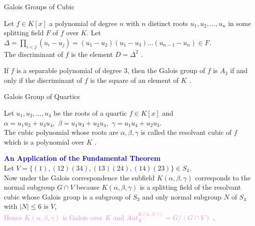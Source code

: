 \begin{frame}{Galois Groups of Cubic}
\begin{definition}
  Let \(f \in K[x]\) a polynomial of degree \(n\) with \(n\) distinct roots \(u_1,u_2,...,u_n\) in some splitting field \(F\) of \(f\) over \(K\). Let \\
  \(\Delta = \prod\limits_{i<j}(u_i-u_j) = (u_1-u_2)(u_1-u_3)...(u_{n-1}-u_n) \in F\).\\
  The discriminant of \(f\) is the element \(D= {\Delta}^2\) \cite{hunger}.
\end{definition}
\vspace{5mm}

\begin{theorem}[Theorem]
  If \(f\) is a separable polynomial of degree \(3\), then the Galois group of \(f\) is \(A_3\) if and only if the discriminant of \(f\) is the square of an element of \(K\) \cite{hunger}.
\end{theorem}
\end{frame}

\begin{frame}{Galois Group of Quartics}
  \begin{definition}
Let \(u_1,u_2,...,u_4\) be the roots of a quartic \(f \in K[x]\) and\\ \(\alpha=u_1u_2+u_3u_4,\) \(\beta=u_1u_3+u_2u_4,\) \(\gamma=u_1u_4+u_2u_3\). \\[3mm]
\textcolor{green!50!black}{The cubic polynomial whose roots are \(\alpha,\beta,\gamma \)} is called the resolvant cubic of \(f\) which is a polynomial over \(K\) \cite{hunger}.
\end{definition}
\vspace{2mm}
\textbf{\textcolor{blue}{An Application of the Fundamental Theorem}} \\[3mm]
Let \(V=\{(1),(12)(34),(13)(24),(14)(23)\} \in S_4\).\\[2mm]
Now under \textcolor{green!50!black}{the Galois correspondence the subfield \(K(\alpha, \beta, \gamma)\) corresponds to the normal subgroup \(G \cap V\)} \cite{hunger} because \(K(\alpha,\beta,\gamma)\) is a splitting field of the resolvant cubic
whose Galois group is a subgroup of \(S_3\) and only normal subgroup \(N\) of \(S_4\) with \(|N| \leq 6\) is \(V\),\\[2mm]
\textcolor{violet}{Hence \(K(\alpha, \beta, \gamma)\) is Galois over \(K\) and \(Aut_K^{K(\alpha, \beta, \gamma)} = G/(G \cap V)\) \cite{hunger}}.
\end{frame}

